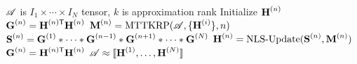 \begin{algorithm}
\caption{$\CP = \text{NNCP}(\TA,k)$}
\label{alg:nncp}
\begin{algorithmic}[1]
\Require $\TA$ is $I_1\times \cdots \times I_N$ tensor, $k$ is approximation rank
\State {}
	\State Initialize $\Mn{H}{n}$ 
	\State $\Mn{G}{n} = \MnTra{H}{n}\Mn{H}{n}$
\EndFor
\State {}
	\State {}
	\State {}
	\State $\Mn{M}{n} = \text{MTTKRP}(\TA,\{\Mn{H}{i}\},n)$
		\label{line:MTTKRP}
	\State $\Mn{S}{n} = \Mn{G}{1} \Hada \cdots \Hada \Mn{G}{n-1} \Hada \Mn{G}{n+1} \Hada \cdots \Hada \Mn{G}{N}$
		\label{line:GH}
	\State $\Mn{H}{n} = \text{NLS-Update}(\Mn{S}{n},\Mn{M}{n})$
		\label{line:NLS}
	\State $\Mn{G}{n} = \MnTra{H}{n}\Mn{H}{n}$
		\label{line:Gn}
	\EndFor
\EndWhile
\Ensure $\TA \approx \CP$
\end{algorithmic}
\end{algorithm}

